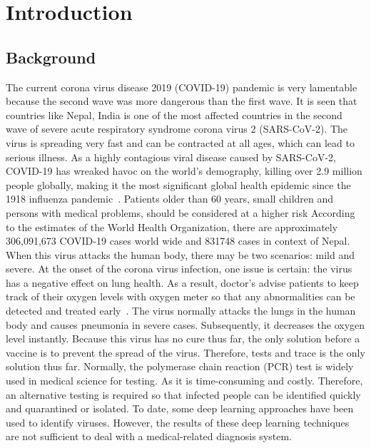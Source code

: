 \section{Introduction}

\subsection{Background}
 
The current corona virus disease 2019 (COVID-19) pandemic is very lamentable because the second wave was more dangerous than the first wave. It is seen that countries like Nepal, India is one of the most affected countries in the second wave of severe acute respiratory syndrome corona virus 2 (SARS-CoV-2). The virus is spreading very fast and can be contracted at all ages, which can lead to serious illness. As a highly contagious viral disease caused by SARS-CoV-2, COVID-19 has wreaked havoc on the world’s demography, killing over 2.9 million people globally, making it the most significant global health epidemic since the 1918 influenza pandemic~\cite{cascella_features_2021}. Patients older than 60 years, small children and persons with medical problems, should be considered at a higher risk According to the estimates of the World Health Organization, there are approximately 306,091,673 COVID-19 cases world wide and 831748 cases in context of Nepal. When this virus attacks the human body, there may be two scenarios: mild and severe. At the onset of the corona virus infection, one issue is certain: the virus has a negative effect on lung health. As a result, doctor’s advise patients to keep track of their oxygen levels with oxygen meter so that any abnormalities can be detected and treated early~\cite{Rubin2020}. The virus normally attacks the lungs in the human body and causes pneumonia in severe cases. Subsequently, it decreases the oxygen level instantly. Because this virus has no cure thus far, the only solution before a vaccine is to prevent the spread of the virus. Therefore, tests and trace is the only solution thus far. Normally, the polymerase chain reaction (PCR) test is widely used in medical science for testing. As it is time-consuming and costly. Therefore, an alternative testing is required so that infected people can be identified quickly and quarantined or isolated. To date, some deep learning approaches have been used to identify viruses. However, the results of these deep learning techniques are not sufficient to deal with a medical-related diagnosis system. 

